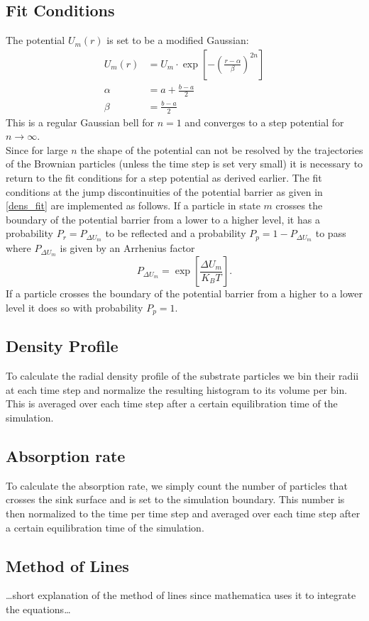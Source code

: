\subsection{Fit Conditions}
The potential $U_m(r)$ is set to be a modified Gaussian:
\begin{align}
    U_m(r) &= U_m \cdot \exp \left[-\left( \frac{r-\alpha}{\beta} \right)^{2n}\right] \nonumber \\
    \alpha &= a + \frac{b-a}{2} \nonumber \\
    \beta  &= \frac{b-a}{2}
    \label{mod_gauss}
\end{align}
This is a regular Gaussian bell for $n=1$ and converges to a step potential for $n\rightarrow \infty$. \\
Since for large $n$ the shape of the potential can not be resolved by the trajectories of the Brownian particles (unless the time step is set very small) it is necessary to return to the fit conditions for a step potential as derived earlier.
The fit conditions at the jump discontinuities of the potential barrier as given in \eqref{dens_fit} are implemented as follows. If a particle in state $m$ crosses the boundary of the potential barrier from a lower to a higher level, it has a probability $P_r = P_{\Delta U_m}$ to be reflected and a probability $P_p = 1 - P_{\Delta U_m}$ to pass where $P_{\Delta U_m}$ is given by an Arrhenius factor
\begin{equation}
    P_{ \Delta U_m} = \exp \left[\frac{\Delta U_m}{K_B T}  \right].
    \label{arrhenius_factor}
\end{equation}
If a particle crosses the boundary of the potential barrier from a higher to a lower level it does so with probability $P_p = 1$.
\subsection{Density Profile}
To calculate the radial density profile of the substrate particles we bin their radii at each time step and normalize the resulting histogram to its volume per bin. This is averaged over each time step after a certain equilibration time of the simulation.
\subsection{Absorption rate}
To calculate the absorption rate, we simply count the number of particles that crosses the sink surface and is set to the simulation boundary. This number is then normalized to the time per time step and averaged over each time step after a certain equilibration time of the simulation.
\subsection{Method of Lines}
\dots short explanation of the method of lines since mathematica uses it to integrate the equations\dots
